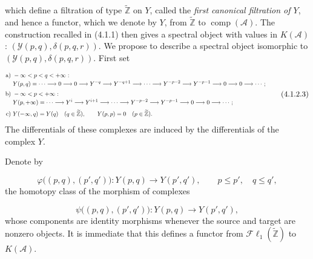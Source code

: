 \clearpage
{}%
\begingroup\small\setlength{\parskip}{0pt}\setlength{\emergencystretch}{1.5em}
\setlength{\abovedisplayskip}{4pt plus 2pt minus 2pt}%
\setlength{\belowdisplayskip}{4pt plus 2pt minus 2pt}%

which define a filtration of type $\widetilde{\mathbb Z}$ on $Y$, called
the \emph{first canonical filtration of $Y$}, and hence a functor, which we
denote by $Y$, from $\widetilde{\mathbb Z}$ to
$\operatorname{comp}(\mathcal A)$. The construction recalled in (4.1.1)
then gives a spectral object with values in $K(\mathcal A)$:
$(\mathcal Y(p,q),\delta(p,q,r))$. We propose to describe a spectral object
isomorphic to $(\mathcal Y(p,q),\delta(p,q,r))$. First set

\begin{equation}
\resizebox{0.98\textwidth}{!}{%
$\displaystyle
\begin{aligned}
\text{a) }& -\infty<p<q<+\infty:\\[-2pt]
&Y(p,q)=\cdots\longrightarrow0\longrightarrow0\longrightarrow Y^{-q}
\longrightarrow Y^{-q+1}\longrightarrow\cdots\longrightarrow Y^{-p-2}
\longrightarrow Y^{-p-1}\longrightarrow0\longrightarrow0
\longrightarrow\cdots;\\[2pt]
\text{b) }& -\infty<p<+\infty:\\[-2pt]
&Y(p,+\infty)=\cdots\longrightarrow Y^i\longrightarrow Y^{i+1}
\longrightarrow\cdots\longrightarrow Y^{-p-2}\longrightarrow Y^{-p-1}
\longrightarrow0\longrightarrow0\longrightarrow\cdots;\\[2pt]
\text{c) }&Y(-\infty,q)=Y(q)\quad(q\in\widetilde{\mathbb Z}),\qquad
Y(p,p)=0\quad(p\in\widetilde{\mathbb Z}).
\end{aligned}$%
}
\tag{4.1.2.3}
\end{equation}
The differentials of these complexes are induced by the differentials of
the complex $Y$.

Denote by

\begin{equation}
\varphi\bigl((p,q),(p',q')\bigr)\colon
Y(p,q)\longrightarrow Y(p',q'),\qquad p\leq p',\quad q\leq q',
\tag{4.1.2.4}
\end{equation}
the homotopy class of the morphism of complexes

\begin{equation}
\psi\bigl((p,q),(p',q')\bigr)\colon
Y(p,q)\longrightarrow Y(p',q'),
\tag{4.1.2.5}
\end{equation}
whose components are identity morphisms whenever the source and target are
nonzero objects. It is immediate that this defines a functor from
$\mathcal{F}\ell_1(\widetilde{\mathbb Z})$ to $K(\mathcal A)$.

